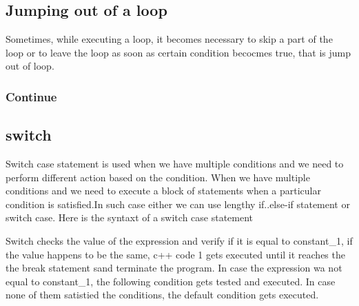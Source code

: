 \documentclass[11pt, a4paper]{article}
\begin{document}
\subsection{Jumping out of a loop}
Sometimes, while executing a loop, it becomes necessary to skip a part of the loop or to leave
the loop as soon as certain condition becocmes true, that is jump out of loop.
\subsubsection{Continue}


\subsection{switch}
Switch case statement is used when we have multiple conditions and we need to perform different
action based on the condition. When we have multiple conditions and we need to execute a block of
statements when a particular condition is satisfied.In such case either we can use lengthy
if..else-if statement or switch case. Here is the syntaxt of a switch case statement

Switch checks the value of the expression and verify if it is equal to constant\_1, if the value happens
to be the same, c++ code 1 gets executed until it reaches the the break statement sand terminate the
program. In case the expression wa not equal to constant\_1, the following condition gets tested 
and executed. In case none of them satistied the conditions, the default condition gets executed.
\end{document}
